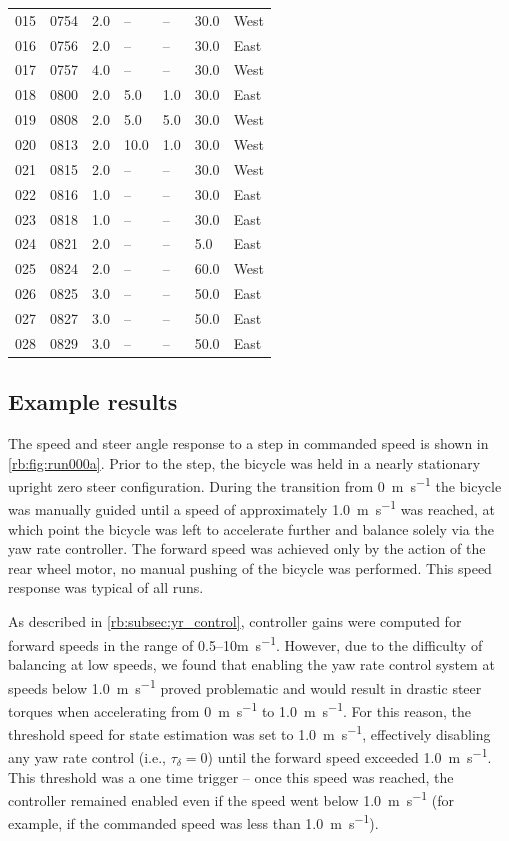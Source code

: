 \begin{center}
\begin{longtable}{lllllll}
  015 & 0754 & 2.0 & -- & -- & 30.0 & West \\
  016 & 0756 & 2.0 & -- & -- & 30.0 & East \\
  017 & 0757 & 4.0 & -- & -- & 30.0 & West \\
  018 & 0800 & 2.0 & 5.0 & 1.0 & 30.0 & East \\
  019 & 0808 & 2.0 & 5.0 & 5.0 & 30.0 & West \\
  020 & 0813 & 2.0 & 10.0 & 1.0 & 30.0 & West \\
  021 & 0815 & 2.0 & -- & -- & 30.0 & West \\
  022 & 0816 & 1.0 & -- & -- & 30.0 & East \\
  023 & 0818 & 1.0 & -- & -- & 30.0 & East \\
  024 & 0821 & 2.0 & -- & -- & 5.0 & East \\
  025 & 0824 & 2.0 & -- & -- & 60.0 & West \\
  026 & 0825 & 3.0 & -- & -- & 50.0 & East \\
  027 & 0827 & 3.0 & -- & -- & 50.0 & East \\
  028 & 0829 & 3.0 & -- & -- & 50.0 & East \\
  \end{longtable}
\end{center}

\subsection{Example results} \label{rb:subsec:results}
The speed and steer angle response to a step in commanded speed is shown in
\autoref{rb:fig:run000a}. Prior to the step, the bicycle was held in a nearly
stationary upright zero steer configuration.  During the transition from
\SI{0}{\m\per\s} the bicycle was manually guided until a speed of approximately
\SI{1.0}{\m\per\s} was reached, at which point the bicycle was left to
accelerate further and balance solely via the yaw rate controller. The forward
speed was achieved only by the action of the rear wheel motor, no manual
pushing of the bicycle was performed.  This speed response was typical of all
runs.

As described in \autoref{rb:subsec:yr_control}, controller gains were computed
for forward speeds in the range of 0.5--10\si{\m\per\s}. However, due to the
difficulty of balancing at low speeds, we found that enabling the yaw rate
control system at speeds below \SI{1.0}{\m\per\s} proved problematic and would
result in drastic steer torques when accelerating from \SI{0}{\m\per\s} to
\SI{1.0}{\m\per\s}. For this reason, the threshold speed for state estimation
was set to \SI{1.0}{\m\per\s}, effectively disabling any yaw rate control
(i.e., $\tau_\delta = 0$) until the forward speed exceeded \SI{1.0}{\m\per\s}.
This threshold was a one time trigger -- once this speed was reached, the
controller remained enabled even if the speed went below \SI{1.0}{\m\per\s}
(for example, if the commanded speed was less than \SI{1.0}{\m\per\s}).

